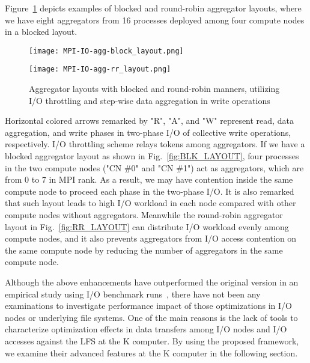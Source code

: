 \documentclass{jhps}
\begin{document}
Figure~\ref{fig:AGG_RR_LAYOUT} depicts examples of blocked and round-robin
aggregator layouts, where we have eight aggregators from 16 processes
deployed among four compute nodes in a blocked layout.
%
\begin{figure}[htb]
\centering
\begin{minipage}[t]{0.36\textwidth}
\centering
\texttt{[image: MPI-IO-agg-block\_layout.png]}
\label{fig:BLK_LAYOUT}
\end{minipage}
\noindent
\begin{minipage}[t]{0.36\textwidth}
\centering
\texttt{[image: MPI-IO-agg-rr\_layout.png]}
\label{fig:RR_LAYOUT}
\end{minipage}
\caption{Aggregator layouts with blocked and round-robin manners,
utilizing I/O throttling and step-wise data aggregation in write operations}
\label{fig:AGG_RR_LAYOUT}
\end{figure}
%
Horizontal colored arrows remarked by "R", "A", and "W" represent
read, data aggregation, and write phases in two-phase I/O of collective write
operations, respectively.
I/O throttling scheme relays tokens among aggregators.
If we have a blocked aggregator layout as shown in
Fig.~\ref{fig:BLK_LAYOUT},
four processes in the two compute nodes ("CN \#0" and "CN \#1")
act as aggregators, which are from 0 to 7 in MPI rank.
As a result, we may have contention inside the same compute node
to proceed each phase in the two-phase I/O.
It is also remarked that such layout leads to high I/O workload
in each node compared with other compute nodes without aggregators.
Meanwhile the round-robin aggregator layout in
Fig.~\ref{fig:RR_LAYOUT}
can distribute I/O workload evenly
among compute nodes, and it also prevents aggregators
from I/O access contention on the same compute node
by reducing the number of aggregators in the same compute node.

Although the above enhancements have outperformed the original version
in an empirical study using I/O benchmark runs~\cite{tsujita:WS_EuroMPI2014,tsujita:hpcasia18},
there have not been any examinations to investigate performance impact
of those optimizations in I/O nodes or underlying file systems.
One of the main reasons is the lack of tools to characterize optimization
effects in data transfers among I/O nodes and I/O accesses
against the LFS at the K computer.
By using the proposed framework, we examine their advanced features
at the K computer in the following section.
\end{document}
